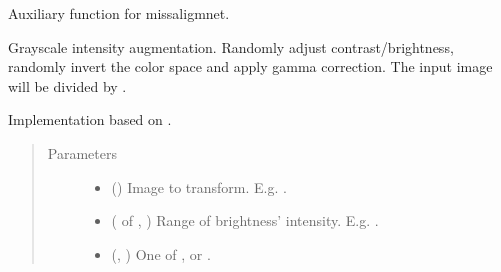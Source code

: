 \documentclass[letterpaper,10pt,english]{sphinxmanual}
\begin{document}
\begin{fulllineitems}
\label{\detokenize{data/generators/augmentors:data.generators.augmentors.random_rotate_matrix}}
Auxiliary function for missaligmnet.

\end{fulllineitems}


\begin{fulllineitems}
\label{\detokenize{data/generators/augmentors:data.generators.augmentors.brightness}}
Grayscale intensity augmentation. Randomly adjust contrast/brightness, randomly invert the color space and apply
gamma correction. The input image will be divided by .

Implementation based on .
\begin{quote}\begin{description}
\item[{Parameters}] \leavevmode\begin{itemize}
\item {} 
 () \textendash{} Image to transform. E.g. .

\item {} 
 ( of , ) \textendash{} Range of brightness’ intensity. E.g. .

\item {} 
 (, ) \textendash{} One of ,  or .


\end{itemize}
\end{description}
\end{quote}
\end{fulllineitems}
\end{document}
